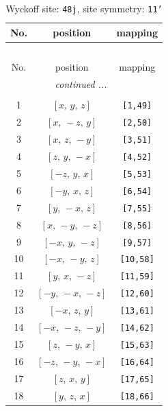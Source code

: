 \documentclass[fleqn,8pt]{jsarticle}
\begin{document}
\renewcommand{\arraystretch}{1.2}
\begin{longtable}{ccc}
\caption{Wyckoff site: {\tt 48j}, site symmetry: {\tt 11'}}
 \\
 \hline \hline
No. & position & mapping \\ \hline \endfirsthead

\multicolumn{2}{l}{\tablename\ \thetable{}} \\
 \hline \hline
No. & position & mapping \\ \hline \endhead

 \hline \hline
\multicolumn{2}{r}{\footnotesize\it continued ...} \\ \endfoot

 \hline \hline
\multicolumn{2}{r}{} \\ \endlastfoot

1 & $\left[ x,\, y,\, z \right]$ & {\tt [1,49]} \\ \hline
2 & $\left[ x,\, - z,\, y \right]$ & {\tt [2,50]} \\ \hline
3 & $\left[ x,\, z,\, - y \right]$ & {\tt [3,51]} \\ \hline
4 & $\left[ z,\, y,\, - x \right]$ & {\tt [4,52]} \\ \hline
5 & $\left[ - z,\, y,\, x \right]$ & {\tt [5,53]} \\ \hline
6 & $\left[ - y,\, x,\, z \right]$ & {\tt [6,54]} \\ \hline
7 & $\left[ y,\, - x,\, z \right]$ & {\tt [7,55]} \\ \hline
8 & $\left[ x,\, - y,\, - z \right]$ & {\tt [8,56]} \\ \hline
9 & $\left[ - x,\, y,\, - z \right]$ & {\tt [9,57]} \\ \hline
10 & $\left[ - x,\, - y,\, z \right]$ & {\tt [10,58]} \\ \hline
11 & $\left[ y,\, x,\, - z \right]$ & {\tt [11,59]} \\ \hline
12 & $\left[ - y,\, - x,\, - z \right]$ & {\tt [12,60]} \\ \hline
13 & $\left[ - x,\, z,\, y \right]$ & {\tt [13,61]} \\ \hline
14 & $\left[ - x,\, - z,\, - y \right]$ & {\tt [14,62]} \\ \hline
15 & $\left[ z,\, - y,\, x \right]$ & {\tt [15,63]} \\ \hline
16 & $\left[ - z,\, - y,\, - x \right]$ & {\tt [16,64]} \\ \hline
17 & $\left[ z,\, x,\, y \right]$ & {\tt [17,65]} \\ \hline
18 & $\left[ y,\, z,\, x \right]$ & {\tt [18,66]} \\ \hline

\end{longtable}
\end{document}
